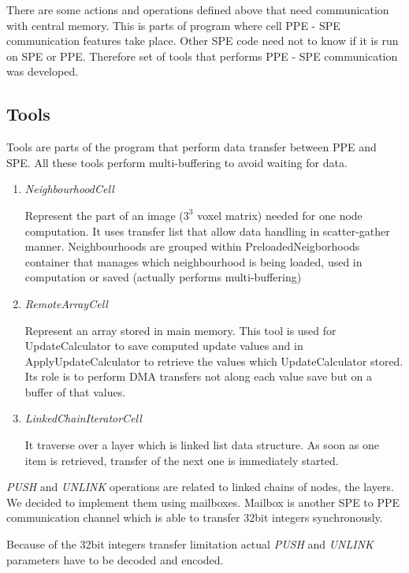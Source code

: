 
\par
There are some actions and operations defined above that need communication with central memory.
This is parts of program where cell PPE - SPE communication features take place.
Other SPE code need not to know if it is run on SPE or PPE.
Therefore set of tools that performs PPE - SPE communication was developed.

\subsection{Tools}
Tools are parts of the program that perform data transfer between PPE and SPE.
All these tools perform multi-buffering to avoid waiting for data.

\begin{enumerate}
\item \emph{NeighbourhoodCell}
\par
Represent the part of an image ($3^3$ voxel matrix) needed for one node computation.
It uses transfer list that allow data handling in scatter-gather manner.
Neighbourhoods are grouped within PreloadedNeigborhoods container that manages which neighbourhood is being loaded, used in computation or saved (actually performs multi-buffering)

\item \emph{RemoteArrayCell}
\par
Represent an array stored in main memory.
This tool is used for UpdateCalculator to save computed update values and in ApplyUpdateCalculator to retrieve the values which UpdateCalculator stored.
Its role is to perform DMA transfers not along each value save but on a buffer of that values.

\item \emph{LinkedChainIteratorCell}
\par
It traverse over a layer which is linked list data structure.
As soon as one item is retrieved, transfer of the next one is immediately started.
\end{enumerate}

\par
\emph{PUSH} and \emph{UNLINK} operations are related to linked chains of nodes, the layers.
We decided to implement them using mailboxes.
Mailbox is another SPE to PPE communication channel which is able to transfer 32bit integers synchronously.

\par
Because of the 32bit integers transfer limitation actual \emph{PUSH} and \emph{UNLINK} parameters have to be decoded and encoded.


